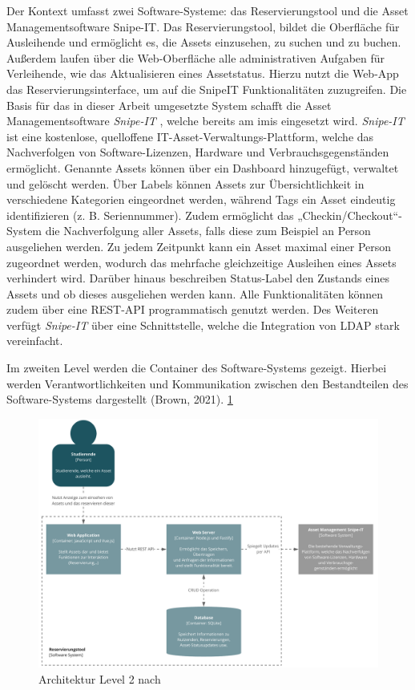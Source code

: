 Der Kontext umfasst zwei Software-Systeme: das Reservierungstool und die Asset Managementsoftware
Snipe-IT. Das Reservierungstool, bildet die Oberfläche für Ausleihende und ermöglicht es, die Assets
einzusehen, zu suchen und zu buchen. Außerdem laufen über die Web-Oberfläche alle administrativen
Aufgaben für Verleihende, wie das Aktualisieren eines Assetstatus. Hierzu nutzt die Web-App das
Reservierungsinterface, um auf die SnipeIT Funktionalitäten zuzugreifen.  
Die Basis für das in dieser Arbeit umgesetzte System schafft die Asset Managementsoftware
\textit{Snipe-IT} \cite{noauthor_home_nodate}, welche bereits am \ac{imis} eingesetzt wird.
\textit{Snipe-IT} ist eine kostenlose, quelloffene IT-Asset-Verwaltungs-Plattform, welche das
Nachverfolgen von Software-Lizenzen, Hardware und Verbrauchsgegenständen ermöglicht. Genannte Assets
können über ein Dashboard hinzugefügt, verwaltet und gelöscht werden. Über Labels können Assets zur
Übersichtlichkeit in verschiedene Kategorien eingeordnet werden, während Tags ein Asset eindeutig
identifizieren (z. B. Seriennummer). Zudem ermöglicht das „Checkin/Checkout“-System die
Nachverfolgung aller Assets, falls diese zum Beispiel an Person ausgeliehen werden. Zu jedem
Zeitpunkt kann ein Asset maximal einer Person zugeordnet werden, wodurch das mehrfache gleichzeitige
Ausleihen eines Assets verhindert wird. Darüber hinaus beschreiben Status-Label den Zustands eines
Assets und ob dieses ausgeliehen werden kann. Alle Funktionalitäten können zudem über eine REST-API
programmatisch genutzt werden. Des Weiteren verfügt \textit{Snipe-IT} über eine Schnittstelle,
welche die Integration von LDAP stark vereinfacht.

{\sffamily\color{maincolor}{Level 2: Container}}

Im zweiten Level werden die Container des Software-Systems gezeigt. Hierbei werden Verantwortlichkeiten und
Kommunikation zwischen den Bestandteilen des Software-Systems dargestellt (Brown, 2021). \ref{fig:level2}

\begin{figure}[h]
    \centering
    \includegraphics[scale=0.47]{Bilder/level2.pdf}
    \caption[Architektur Level 2]{Architektur Level 2 nach }
    \label{fig:level2}
\end{figure}

